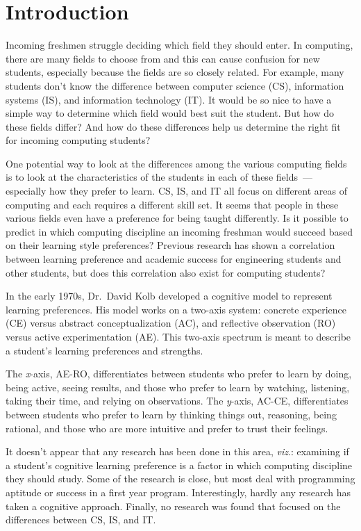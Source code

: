 \chapter{Introduction}\label{chp:chapter1}
Incoming freshmen struggle deciding which field they should enter. In computing, there are many fields to choose from and this can cause confusion for new students, especially because the fields are so closely related. For example, many students don't know the difference between computer science (CS), information systems (IS), and information technology (IT). It would be so nice to have a simple way to determine which field would best suit the student. But how do these fields differ? And how do these differences help us determine the right fit for incoming computing students?

One potential way to look at the differences among the various computing fields is to look at the characteristics of the students in each of these fields~--- especially how they prefer to learn. CS, IS, and IT all focus on different areas of computing and each requires a different skill set. It seems that people in these various fields even have a preference for being taught differently. Is it possible to predict in which computing discipline an incoming freshman would succeed based on their learning style preferences? Previous research has shown a correlation between learning preference and academic success for engineering students and other students, but does this correlation also exist for computing students?

In the early 1970s, Dr.\ David Kolb developed a cognitive model to represent learning preferences. His model works on a two-axis system: concrete experience (CE) versus abstract conceptualization (AC), and reflective observation (RO) versus active experimentation (AE). This two-axis spectrum is meant to describe a student's learning preferences and strengths.

The \textit{x}-axis, AE-RO, differentiates between students who prefer to learn by doing, being active, seeing results, and those who prefer to learn by watching, listening, taking their time, and relying on observations. The \textit{y}-axis, AC-CE, differentiates between students who prefer to learn by thinking things out, reasoning, being rational, and those who are more intuitive and prefer to trust their feelings.

It doesn't appear that any research has been done in this area, \textit{viz}.: examining if a student's cognitive learning preference is a factor in which computing discipline they should study. Some of the research is close, but most deal with programming aptitude or success in a first year program. Interestingly, hardly any research has taken a cognitive approach. Finally, no research was found that focused on the differences between CS, IS, and IT.


